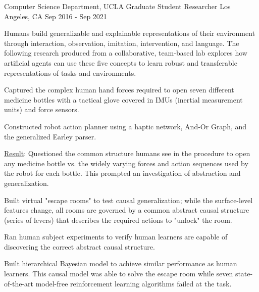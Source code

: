 \begin{cventries}
\cventry
{Computer Science Department, UCLA}
{Graduate Student Researcher}
{Los Angeles, CA}
{Sep 2016 - Sep 2021}
{
\begin{justify}
Humans build generalizable and explainable representations of their environment through interaction, observation, imitation, intervention, and language. The following research produced from a collaborative, team-based lab explores how artificial agents can use these five concepts to learn robust and transferable representations of tasks and environments.
\end{justify}
%
\begin{justify}
\end{justify}
\vspace{-1mm}
\begin{cvitems}
  \item Captured the complex human hand forces required to open seven different medicine bottles with a tactical glove covered in IMUs (inertial measurement units) and force sensors.
  \item Constructed robot action planner using a haptic network, And-Or Graph, and the generalized Earley parser.
  \item \underline{Result}: Questioned the common structure humans see in the procedure to open any medicine bottle vs. the widely varying forces and action sequences used by the robot for each bottle. This prompted an investigation of abstraction and generalization.
\end{cvitems}
%
\begin{justify}
\end{justify}
\vspace{-1mm}
\begin{cvitems}
  \item Built virtual "escape rooms" to test causal generalization; while the surface-­level features change, all rooms are governed by a common abstract causal structure (series of levers) that describes the required actions to "unlock" the room.
  \item Ran human subject experiments to verify human learners are capable of discovering the correct abstract causal structure.
  \item Built hierarchical Bayesian model to achieve similar performance as human learners.  This causal model was able to solve the escape room while seven state-of-the-art model-free reinforcement learning algorithms failed at the task.

\end{cvitems}}
\end{cventries}
